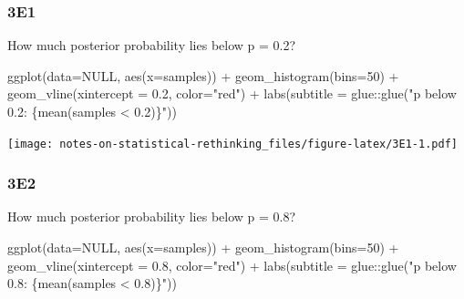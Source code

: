 \documentclass[
]{book}
\newenvironment{Shaded}{\begin{snugshade}}{\end{snugshade}}
\newcommand{\AttributeTok}[1]{\textcolor[rgb]{0.77,0.63,0.00}{#1}}
\newcommand{\ConstantTok}[1]{\textcolor[rgb]{0.00,0.00,0.00}{#1}}
\newcommand{\DecValTok}[1]{\textcolor[rgb]{0.00,0.00,0.81}{#1}}
\newcommand{\FloatTok}[1]{\textcolor[rgb]{0.00,0.00,0.81}{#1}}
\newcommand{\FunctionTok}[1]{\textcolor[rgb]{0.00,0.00,0.00}{#1}}
\newcommand{\NormalTok}[1]{#1}
\newcommand{\SpecialCharTok}[1]{\textcolor[rgb]{0.00,0.00,0.00}{#1}}
\newcommand{\StringTok}[1]{\textcolor[rgb]{0.31,0.60,0.02}{#1}}
\begin{document}
\hypertarget{e1-1}{%
\subsubsection*{3E1}\label{e1-1}}

How much posterior probability lies below p = 0.2?

\begin{Shaded}
\begin{Highlighting}[]
\FunctionTok{ggplot}\NormalTok{(}\AttributeTok{data=}\ConstantTok{NULL}\NormalTok{, }\FunctionTok{aes}\NormalTok{(}\AttributeTok{x=}\NormalTok{samples)) }\SpecialCharTok{+} 
  \FunctionTok{geom\_histogram}\NormalTok{(}\AttributeTok{bins=}\DecValTok{50}\NormalTok{) }\SpecialCharTok{+} 
  \FunctionTok{geom\_vline}\NormalTok{(}\AttributeTok{xintercept =} \FloatTok{0.2}\NormalTok{, }\AttributeTok{color=}\StringTok{"red"}\NormalTok{) }\SpecialCharTok{+} 
  \FunctionTok{labs}\NormalTok{(}\AttributeTok{subtitle =}\NormalTok{ glue}\SpecialCharTok{::}\FunctionTok{glue}\NormalTok{(}\StringTok{"p below 0.2: \{mean(samples \textless{} 0.2)\}"}\NormalTok{))}
\end{Highlighting}
\end{Shaded}

\texttt{[image: notes-on-statistical-rethinking\_files/figure-latex/3E1-1.pdf]}

\hypertarget{e2-1}{%
\subsubsection*{3E2}\label{e2-1}}

How much posterior probability lies below p = 0.8?

\begin{Shaded}
\begin{Highlighting}[]
\FunctionTok{ggplot}\NormalTok{(}\AttributeTok{data=}\ConstantTok{NULL}\NormalTok{, }\FunctionTok{aes}\NormalTok{(}\AttributeTok{x=}\NormalTok{samples)) }\SpecialCharTok{+} 
  \FunctionTok{geom\_histogram}\NormalTok{(}\AttributeTok{bins=}\DecValTok{50}\NormalTok{) }\SpecialCharTok{+} 
  \FunctionTok{geom\_vline}\NormalTok{(}\AttributeTok{xintercept =} \FloatTok{0.8}\NormalTok{, }\AttributeTok{color=}\StringTok{"red"}\NormalTok{) }\SpecialCharTok{+} 
  \FunctionTok{labs}\NormalTok{(}\AttributeTok{subtitle =}\NormalTok{ glue}\SpecialCharTok{::}\FunctionTok{glue}\NormalTok{(}\StringTok{"p below 0.8: \{mean(samples \textless{} 0.8)\}"}\NormalTok{))}
\end{Highlighting}
\end{Shaded}
\end{document}
